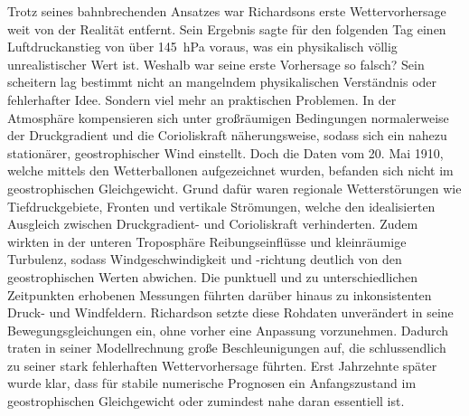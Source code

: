 Trotz seines bahnbrechenden Ansatzes war Richardsons erste Wettervorhersage weit von der Realität entfernt. 
Sein Ergebnis sagte für den folgenden Tag einen Luftdruckanstieg von über \SI{145}{\hecto\pascal} voraus, was ein physikalisch völlig unrealistischer Wert ist. 
Weshalb war seine erste Vorhersage so falsch? 
Sein scheitern lag bestimmt nicht an mangelndem physikalischen Verständnis oder fehlerhafter Idee. 
Sondern viel mehr an praktischen Problemen.
In der Atmosphäre kompensieren sich unter großräumigen Bedingungen normalerweise der Druckgradient und die Corioliskraft näherungsweise, sodass sich ein nahezu stationärer, geostrophischer Wind einstellt.
Doch die Daten vom 20. Mai 1910, welche mittels den Wetterballonen aufgezeichnet wurden, befanden sich nicht im geostrophischen Gleichgewicht.
Grund dafür waren regionale Wetterstörungen wie Tiefdruckgebiete, Fronten und vertikale Strömungen, welche den idealisierten Ausgleich zwischen Druckgradient- und Corioliskraft verhinderten.
Zudem wirkten in der unteren Troposphäre Reibungseinflüsse und kleinräumige Turbulenz, sodass Windgeschwindigkeit und -richtung deutlich von den geostrophischen Werten abwichen.
Die punktuell und zu unterschiedlichen Zeitpunkten erhobenen Messungen führten darüber hinaus zu inkonsistenten Druck- und Windfeldern.
Richardson setzte diese Rohdaten unverändert in seine Bewegungsgleichungen ein, ohne vorher eine Anpassung vorzunehmen.
Dadurch traten in seiner Modellrechnung große Beschleunigungen auf, die schlussendlich zu seiner stark fehlerhaften Wettervorhersage führten.
Erst Jahrzehnte später wurde klar, dass für stabile numerische Prognosen ein Anfangszustand im geostrophischen Gleichgewicht oder zumindest nahe daran essentiell ist.


 



